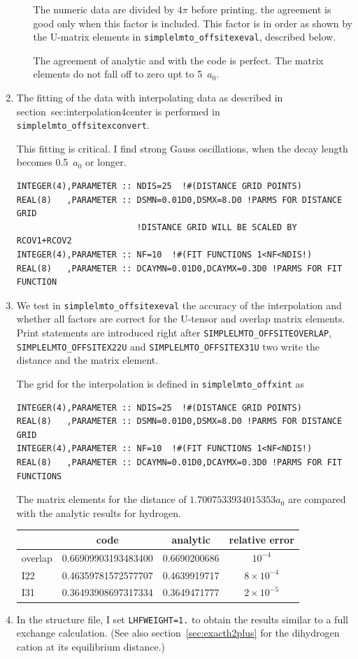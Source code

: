 \documentclass[11pt,a4paper]{report}
\begin{document}
\begin{enumerate}
\begin{itemize}
    The numeric data are divided by $4\pi$ before printing.  the
    agreement is good only when this factor is included. This factor
    is in order as shown by the U-matrix elements in
    \verb|simplelmto_offsitexeval|, described below.

    The agreement of analytic and with the code is perfect. The matrix
    elements do not fall off to zero upt to 5~$a_0$.
  \end{itemize}
%
\item The fitting of the data with interpolating data as described in
  section~{sec:interpolation4center} is performed in
  \verb|simplelmto_offsitexconvert|.

  This fitting is critical. I find strong Gauss oscillations, when the
  decay length becomes 0.5~$a_0$ or longer. 
\begin{verbatim}
INTEGER(4),PARAMETER :: NDIS=25  !#(DISTANCE GRID POINTS)
REAL(8)   ,PARAMETER :: DSMN=0.01D0,DSMX=8.D0 !PARMS FOR DISTANCE GRID
                        !DISTANCE GRID WILL BE SCALED BY RCOV1+RCOV2 
INTEGER(4),PARAMETER :: NF=10  !#(FIT FUNCTIONS 1<NF<NDIS!)
REAL(8)   ,PARAMETER :: DCAYMN=0.01D0,DCAYMX=0.3D0 !PARMS FOR FIT FUNCTION
\end{verbatim}
%
\item We test in \verb|simplelmto_offsitexeval| the accuracy of the
  interpolation and whether all factors are correct for the U-tensor
  and overlap matrix elements.  Print statements are introduced right
  after \verb|SIMPLELMTO_OFFSITEOVERLAP|,
  \verb|SIMPLELMTO_OFFSITEX22U| and \verb|SIMPLELMTO_OFFSITEX31U| two
  write the distance and the matrix element.  

The grid for the interpolation is defined in \verb|simplelmto_offxint|
as
\begin{verbatim}
INTEGER(4),PARAMETER :: NDIS=25  !#(DISTANCE GRID POINTS)
REAL(8)   ,PARAMETER :: DSMN=0.01D0,DSMX=8.D0 !PARMS FOR DISTANCE GRID
INTEGER(4),PARAMETER :: NF=10  !#(FIT FUNCTIONS 1<NF<NDIS!)
REAL(8)   ,PARAMETER :: DCAYMN=0.01D0,DCAYMX=0.3D0 !PARMS FOR FIT FUNCTIONS
\end{verbatim}

The matrix elements for the distance of $1.7007533934015353 a_0$ are
compared with the analytic results for hydrogen.
\begin{center}
\begin{tabular}{lccc}
\hline
        & code & analytic & relative error\\
\hline
overlap & 0.66909903193483400 &  0.6690200686  & $10^{-4}$\\
I22     & 0.46359781572577707 &  0.4639919717  & $8\times10^{-4}$\\
I31     & 0.36493908697317334 &  0.3649471777  & $2\times 10^{-5}$\\
\hline
\end{tabular}
\end{center}
%
\item In the structure file, I set \verb|LHFWEIGHT=1.| to obtain the
  results similar to a full exchange calculation. (See also
  section~\ref{sec:exacth2plus} for the dihydrogen cation at its
  equilibrium distance.)



\end{enumerate}
\end{document}
